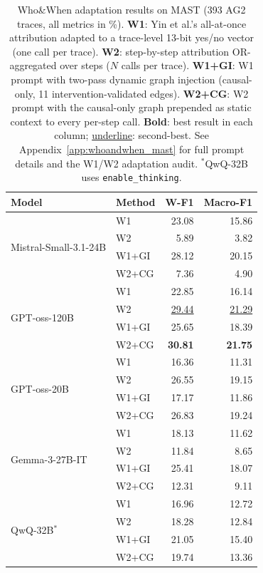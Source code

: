 \begin{table}[t]
\centering
\small
\setlength{\tabcolsep}{8pt}
\renewcommand{\arraystretch}{1.2}
\begin{tabular}{l l rr}
\toprule
\textbf{Model} & \textbf{Method} & \textbf{W-F1} & \textbf{Macro-F1} \\
\midrule
\multirow{4}{*}{Mistral-Small-3.1-24B}
  & W1     & 23.08              & 15.86              \\
  & W2     &  5.89              &  3.82              \\
  & W1+GI  & 28.12              & 20.15              \\
  & W2+CG  &  7.36              &  4.90              \\[3pt]
\multirow{4}{*}{GPT-oss-120B}
  & W1     & 22.85              & 16.14              \\
  & W2     & \underline{29.44}  & \underline{21.29}  \\
  & W1+GI  & 25.65              & 18.39              \\
  & W2+CG  & \textbf{30.81}     & \textbf{21.75}     \\[3pt]
\multirow{4}{*}{GPT-oss-20B}
  & W1     & 16.36              & 11.31              \\
  & W2     & 26.55              & 19.15              \\
  & W1+GI  & 17.17              & 11.86              \\
  & W2+CG  & 26.83              & 19.24              \\[3pt]
\multirow{4}{*}{Gemma-3-27B-IT}
  & W1     & 18.13              & 11.62              \\
  & W2     & 11.84              &  8.65              \\
  & W1+GI  & 25.41              & 18.07              \\
  & W2+CG  & 12.31              &  9.11              \\[3pt]
\multirow{4}{*}{QwQ-32B$^{*}$}
  & W1     & 16.96              & 12.72              \\
  & W2     & 18.28              & 12.84              \\
  & W1+GI  & 21.05              & 15.40              \\
  & W2+CG  & 19.74              & 13.36              \\
\bottomrule
\end{tabular}
\caption{%
  Who\&When adaptation results on MAST (393 AG2 traces, all metrics in \%).
  \textbf{W1}: Yin et al.'s all-at-once attribution adapted to a
  trace-level 13-bit yes/no vector (one call per trace).
  \textbf{W2}: step-by-step attribution OR-aggregated over steps
  ($N$ calls per trace).
  \textbf{W1+GI}: W1 prompt with two-pass dynamic graph injection
  (causal-only, 11 intervention-validated edges).
  \textbf{W2+CG}: W2 prompt with the causal-only graph prepended as
  static context to every per-step call.
  \textbf{Bold}: best result in each column;
  \underline{underline}: second-best.
  See Appendix~\ref{app:whoandwhen_mast} for full prompt details and
  the W1/W2 adaptation audit.
  $^{*}$QwQ-32B uses \texttt{enable\_thinking}.%
}
\label{tab:mast_who_and_when}
\end{table}
